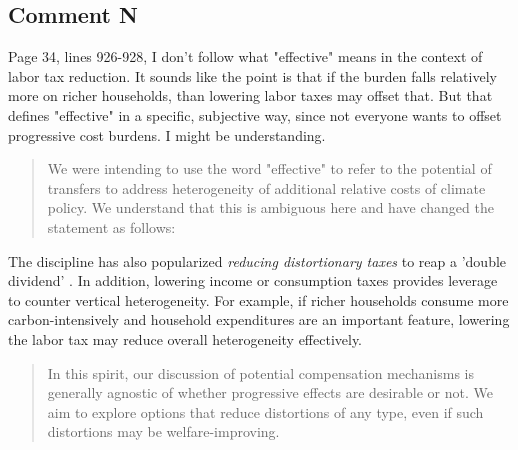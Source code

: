 \documentclass[11pt]{article}
\newenvironment{response}
{\begin{quote}\color{black}}
{\end{quote}}
\begin{document}
\subsection*{Comment N}\label{comment_R1_N}

\begin{commentbox}
    Page 34, lines 926-928, I don't follow what "effective" means in the context of labor tax reduction. It sounds like the point is that if the burden falls relatively more on richer households, than lowering labor taxes may offset that. But that defines "effective" in a specific, subjective way, since not everyone wants to offset progressive cost burdens. I might be understanding.
\end{commentbox}

\begin{response}
    We were intending to use the word "effective" to refer to the potential of transfers to address heterogeneity of additional relative costs of climate policy. We understand that this is ambiguous here and have changed the statement as follows:
\end{response}

\begin{revisionbox}
    The discipline has also popularized \textit{reducing distortionary taxes} to reap a 'double dividend' \autocite{Bovenberg.1996}. In addition, lowering income or consumption taxes provides leverage to counter vertical heterogeneity. For example, if richer households consume more carbon-intensively and household expenditures are an important feature, lowering the labor tax may reduce overall heterogeneity effectively.
\end{revisionbox}

\begin{response}
    In this spirit, our discussion of potential compensation mechanisms is generally agnostic of whether progressive effects are desirable or not. We aim to explore options that reduce distortions of any type, even if such distortions may be welfare-improving.
\end{response}
        
\end{document}
